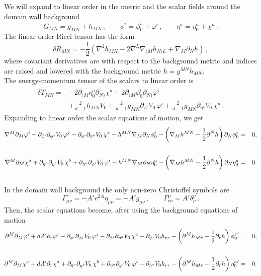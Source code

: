We will expand to linear order in the metric and the scalar fields around the domain wall background
\begin{equation}
	G_{MN}=g_{MN}+h_{MN}
	\,,\qquad \phi^i=\phi^i_0+\varphi^i
	\,,\qquad 
	\eta^a=\eta^a_0+\chi^a\,.
\end{equation}
The linear order Ricci tensor has the form
\begin{equation}
   \delta R_{MN}= -\frac{1}{2}\left(\nabla^2 h_{MN}-2\nabla^L \nabla_{(M}h_{N)L}+\nabla_M \partial_N h\right)\,,
\end{equation}
where covariant derivatives are with respect to the background metric and indices are raised and lowered with the background metric $h=g^{MN}h_{MN}$.\\
The energy-momentum tensor of the scalars to linear order is
\begin{equation}
\begin{split}
     \delta \widetilde T_{MN}=&-2\partial_{(M}\eta_0^a \partial_{N)}\chi^a+2\partial_{(M}\phi_0^i \partial_{N)}\varphi^i\\
     &+\frac{2}{d-1}h_{MN}V_0+\frac{2}{d-1}g_{MN}\partial_{\phi^i} V_0\,\varphi^i+\frac{2}{d-1}g_{MN}\partial_{\eta^a} V_0\,\chi^a\,.
	\end{split}
\end{equation}
Expanding to linear order the scalar equations of motion, we get
\begin{eqnarray}
\notag \nabla^M \partial_M \varphi^i-\partial_{\phi^i}\partial_{\phi^j} V_0\,\varphi^j-\partial_{\phi^i}\partial_{\eta^a} V_0\,\chi^a-h^{MN}\nabla_M\partial_N \phi_0^i-\left(\nabla_M h^{MN}-\frac{1}{2}\partial^N h\right)\partial_N\phi^i_0 &=&0, \\
& & \\
\notag \nabla^M \partial_M \chi^a+\partial_{\eta^a}\partial_{\eta^b} V_0\,\chi^b+\partial_{\eta^a}\partial_{\phi^i} V_0\,\varphi^i-h^{MN}\nabla_M\partial_N \eta_0^a-\left(\nabla_M h^{MN}-\frac{1}{2}\partial^N h\right)\partial_N\eta^a_0 &=&0.\\ & &
\end{eqnarray}
In the domain wall background the only non-zero Christoffel symbols are
\begin{equation}
	\Gamma^r_{\mu\nu}=-A' e^{2A}\eta_{\mu\nu}=-A' g_{\mu\nu}
	\,, \qquad 
	\Gamma^\mu_{r\nu}=A' \delta^\mu_\nu\,.
\end{equation}
Then, the scalar equations become, after using the background equations of motion
\begin{eqnarray}
\notag \partial^M \partial_M \varphi^i+dA'\partial_r\varphi^i -\partial_{\phi^i}\partial_{\phi^j} V_0\,\varphi^j-\partial_{\phi^i}\partial_{\eta^a} V_0\,\chi^a-\partial_{\phi^i} V_0 h_{rr} -\left(\partial^M h_{Mr}-\frac{1}{2}\partial_r h\right){\phi_0^i}' &=&0, \\ & & \\
\notag \partial^M \partial_M \chi^a+dA'\partial_r\chi^a +\partial_{\eta^a}\partial_{\eta^b} V_0\,\chi^b+\partial_{\eta^a}\partial_{\phi^i} V_0\,\varphi^i+\partial_{\eta^a} V_0 h_{rr} -\left(\partial^M h_{Mr}-\frac{1}{2}\partial_r h\right){\eta_0^a}' &=&0 .\\ \label{eq:chieq} & &
\end{eqnarray}
